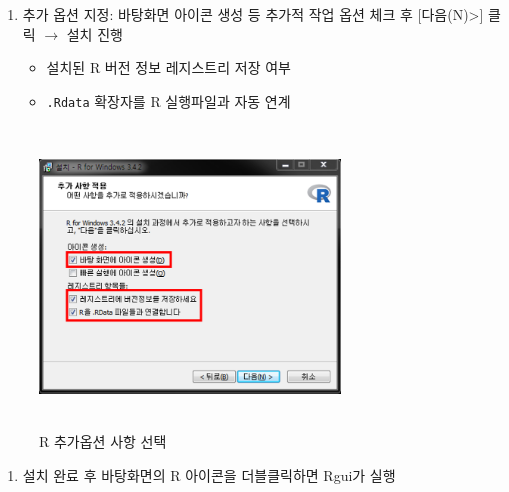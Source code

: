 \documentclass[12pt,a4paper]{book}
\providecommand{\tightlist}{%
  \setlength{\itemsep}{0pt}\setlength{\parskip}{0pt}}
\theoremstyle{definition}
\theoremstyle{definition}
\theoremstyle{definition}
\theoremstyle{remark}
\begin{document}
\begin{enumerate}
\def\labelenumi{\arabic{enumi}.}
\setcounter{enumi}{14}
\tightlist
\item
  추가 옵션 지정: 바탕화면 아이콘 생성 등 추가적 작업 옵션 체크 후
  {[}다음(N)\textgreater{}{]} 클릭 \(\rightarrow\) 설치 진행

  \begin{itemize}
  \tightlist
  \item
    설치된 R 버전 정보 레지스트리 저장 여부
  \item
    \texttt{.Rdata} 확장자를 R 실행파일과 자동 연계
  \end{itemize}
\end{enumerate}

\begin{figure}[H]
{
  \centering
  \includegraphics[width = 8cm, height = 8cm]{Figures/R-install-F09.png}
  \caption[R 추가옵션 사항 선택]{R 추가옵션 사항 선택}\label{fig:R-install-14}
}
\end{figure}

\begin{enumerate}
\def\labelenumi{\arabic{enumi}.}
\setcounter{enumi}{15}
\tightlist
\item
  설치 완료 후 바탕화면의 R 아이콘을 더블클릭하면 Rgui가 실행
\end{enumerate}
\end{document}
